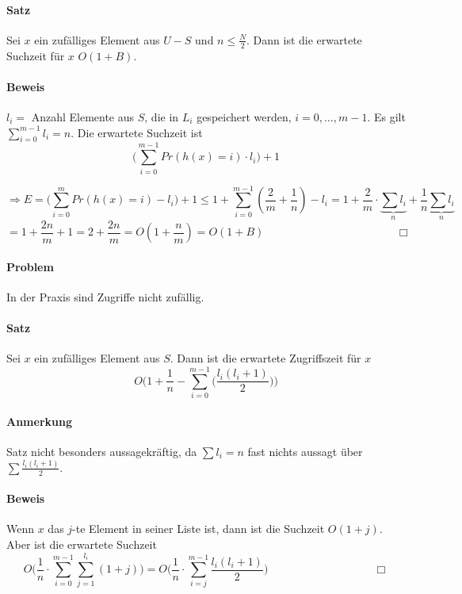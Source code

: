 \paragraph*{Satz} Sei $x$ ein zufälliges Element aus $U-S$ und $n \leq \frac{N}{2}$. Dann ist die erwartete Suchzeit für $x$ $O(1+B)$.

\paragraph*{Beweis} $l_i =$ Anzahl Elemente aus $S$, die in $L_i$ gespeichert werden, $i=0,\dots,m-1$. Es gilt $\sum\limits_{i=0}^{m-1} l_i = n$. Die erwartete Suchzeit ist $$\bigg(\sum\limits_{i=0}^{m-1} Pr(h(x)=i) \cdot l_i\bigg)+1$$


$$\Rightarrow E = \big( \sum\limits_{i=0}^m Pr(h(x)=i) - l_i \big) + 1 \leq 1+ \sum\limits_{i=0}^{m-1}(\frac{2}{m}+\frac{1}{n}) - l_i = 1+\frac{2}{m} \cdot \underbrace{\sum l_i}_{n} + \frac{1}{n} \underbrace{\sum l_i}_{n}$$ %
$$= 1+\frac{2n}{m}+1 = 2+\frac{2n}{m} = O(1+\frac{n}{m}) = O(1+B) \hspace{5cm} \Box$$ %


\paragraph*{Problem} In der Praxis sind Zugriffe nicht zufällig.

\paragraph*{Satz} Sei $x$ ein zufälliges Element aus $S$. Dann ist die erwartete Zugriffszeit für $x$ $$ O\Bigg(1+\frac{1}{n} - \sum\limits_{i=0}^{m-1}\Big( \frac{l_i(l_i+1)}{2} \Big)\Bigg) $$

\paragraph*{Anmerkung} Satz nicht besonders aussagekräftig, da $\sum l_i = n$ fast nichts aussagt über $\sum \frac{l_i(l_i+1)}{2}$.

\paragraph*{Beweis} Wenn $x$ das $j$-te Element in seiner Liste ist, dann ist die Suchzeit $O(1+j)$. Aber ist die erwartete Suchzeit $$ O\Big(\frac{1}{n} \cdot \sum\limits_{i=0}^{m-1} \sum\limits_{j=1}^{l_i} (1+j)\Big) = O\Big(\frac{1}{n} \cdot \sum\limits_{i=j}^{m-1} \frac{l_i(l_i+1)}{2}\Big) \hspace{4cm} \Box$$



